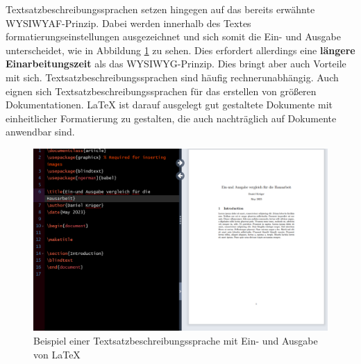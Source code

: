 Textsatzbeschreibungssprachen setzen hingegen auf das bereits erwähnte WYSIWYAF-Prinzip. Dabei werden innerhalb des Textes formatierungseinstellungen ausgezeichnet und sich somit die Ein- und Ausgabe unterscheidet, wie in Abbildung \ref{VergleichLaTeX} zu sehen. Dies erfordert allerdings eine \textbf{längere Einarbeitungszeit} als das WYSIWYG-Prinzip.
Dies bringt aber auch Vorteile mit sich. Textsatzbeschreibungssprachen sind häufig rechnerunabhängig. Auch eignen sich Textsatzbeschreibungssprachen für das erstellen von größeren Dokumentationen. LaTeX ist darauf ausgelegt gut gestaltete Dokumente mit einheitlicher Formatierung zu gestalten, die auch nachträglich auf Dokumente anwendbar sind. 

\begin{figure}[h]
	\centering
	\includegraphics[scale=0.5]{Images/Vergleich_LaTeX.png}
	\caption{Beispiel einer Textsatzbeschreibungssprache mit Ein- und Ausgabe von LaTeX}
	\label{VergleichLaTeX}
\end{figure}

